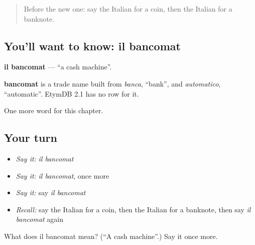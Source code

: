 \label{lesson:IT-C226-bancomat}



\begin{quote}
Before the new one: say the Italian for a coin, then the Italian for a banknote.
\end{quote}

\subsection*{You'll want to know: il bancomat}
\textbf{il bancomat} — \textquotedblleft{}a cash machine\textquotedblright{}.

\begin{cousinweb}
\textbf{bancomat} is a trade name built from \emph{banca}, \textquotedblleft{}bank\textquotedblright{}, and \emph{automatico}, \textquotedblleft{}automatic\textquotedblright{}. EtymDB 2.1 has no row for it.
\end{cousinweb}

\begin{grammarlens}[title={What you've built}]
One more word for this chapter.
\end{grammarlens}

\subsection*{Your turn}
\begin{itemize}
\raggedright
  \item \emph{Say it:} \emph{il bancomat}
  \item \emph{Say it:} \emph{il bancomat}, once more
  \item \emph{Say it:} say \emph{il bancomat}
  \item \emph{Recall:} say the Italian for a coin, then the Italian for a banknote, then say \emph{il bancomat} again
\end{itemize}

\begin{tcolorbox}[breakable,colback=teal!4,colframe=teal!35!black,title={Before you move on}]
What does il bancomat mean? (\textquotedblleft{}A cash machine\textquotedblright{}.) Say it once more.
\end{tcolorbox}
